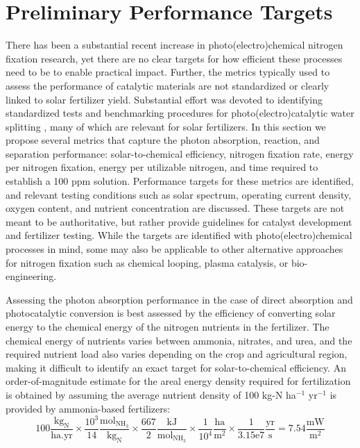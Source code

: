 \section{Preliminary Performance Targets}
\label{sec:targets}

There has been a substantial recent increase in photo(electro)chemical nitrogen fixation research, yet there are no clear targets for how efficient these processes need to be to enable practical impact. Further, the metrics typically used to assess the performance of catalytic materials are not standardized or clearly linked to solar fertilizer yield. Substantial effort was devoted to identifying standardized tests and benchmarking procedures for photo(electro)catalytic water splitting \cite{Chen_2010, McCrory_2013, McCrory_2015, Smith_2016, Bligaard_2016,martin2018electrocatalytic}, many of which are relevant for solar fertilizers. In this section we propose several metrics that capture the photon absorption, reaction, and separation performance: solar-to-chemical efficiency, nitrogen fixation rate, energy per nitrogen fixation, energy per utilizable nitrogen, and time required to establish a 100 ppm solution. Performance targets for these metrics are identified, and relevant testing conditions such as solar spectrum, operating current density, oxygen content, and nutrient concentration are discussed. These targets are not meant to be authoritative, but rather provide guidelines for catalyst development and fertilizer testing. While the targets are identified with photo(electro)chemical processes in mind, some may also be applicable to other alternative approaches for nitrogen fixation such as chemical looping, plasma catalysis, or bio-engineering.

Assessing the photon absorption performance in the case of direct absorption and photocatalytic conversion is best assessed by the efficiency of converting solar energy to the chemical energy of the nitrogen nutrients in the fertilizer. The chemical energy of nutrients varies between ammonia, nitrates, and urea, and the required nutrient load also varies depending on the crop and agricultural region, making it difficult to identify an exact target for solar-to-chemical efficiency. An order-of-magnitude estimate for the areal energy density required for fertilization is obtained by assuming the average nutrient density of 100 kg-N ha$^{-1}$ yr$^{-1}$ is provided by ammonia-based fertilizers:
\begin{equation}
\mathrm{
100 \frac{kg_N}{ha . yr} \times \frac{10^3}{14} \frac{mol_{NH_3}}{kg_N} \times \frac{667}{2} \frac{kJ}{mol_{NH_3}} \times \frac{1}{10^4} \frac{ha}{m^2} \times \frac{1}{3.15e7} \frac{yr}{s} = 7.54 \frac{mW}{m^2}
}
\end{equation}


